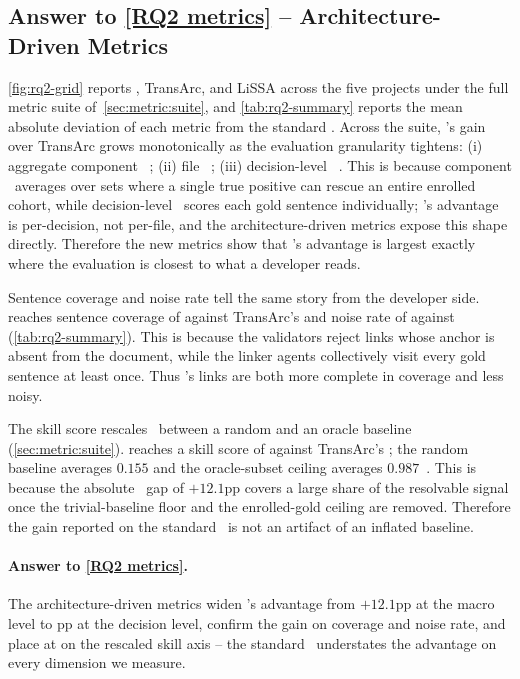 \subsection{Answer to \ref{RQ2 metrics} -- Architecture-Driven Metrics}
\label{sec:results:rq2}

\autoref{fig:rq2-grid} reports \approach{}, TransArc, and LiSSA across the five projects under the full metric suite of~\autoref{sec:metric:suite}, and \autoref{tab:rq2-summary} reports the mean absolute deviation of each metric from the standard \fone.
Across the suite, \approach{}'s gain over TransArc grows monotonically as the evaluation granularity tightens: (i) aggregate component \fone\ ; (ii) file \fone\ ; (iii) decision-level \fone\ .
This is because component \fone\ averages over sets where a single true positive can rescue an entire enrolled cohort, while decision-level \fone\ scores each gold sentence individually; \approach{}'s advantage is per-decision, not per-file, and the architecture-driven metrics expose this shape directly.
Therefore the new metrics show that \approach{}'s advantage is largest exactly where the evaluation is closest to what a developer reads.

Sentence coverage and noise rate tell the same story from the developer side.
\approach{} reaches sentence coverage of  against TransArc's  and noise rate of  against  (\autoref{tab:rq2-summary}).
This is because the validators reject links whose anchor is absent from the document, while the linker agents collectively visit every gold sentence at least once.
Thus \approach{}'s links are both more complete in coverage and less noisy.

The skill score rescales \fone\ between a random and an oracle baseline (\autoref{sec:metric:suite}).
\approach{} reaches a skill score of  against TransArc's ; the random baseline averages $0.155$ and the oracle-subset ceiling averages $0.987$~\cite{evaluation:extreme-baselines}.
This is because the absolute \fone\ gap of $+12.1$pp covers a large share of the resolvable signal once the trivial-baseline floor and the enrolled-gold ceiling are removed.
Therefore the gain reported on the standard \fone\ is not an artifact of an inflated baseline.

\paragraph{Answer to \ref{RQ2 metrics}.}
The architecture-driven metrics widen \approach{}'s advantage from $+12.1$pp at the macro level to pp at the decision level, confirm the gain on coverage and noise rate, and place \approach{} at  on the rescaled skill axis -- the standard \fone\ understates the advantage on every dimension we measure.

